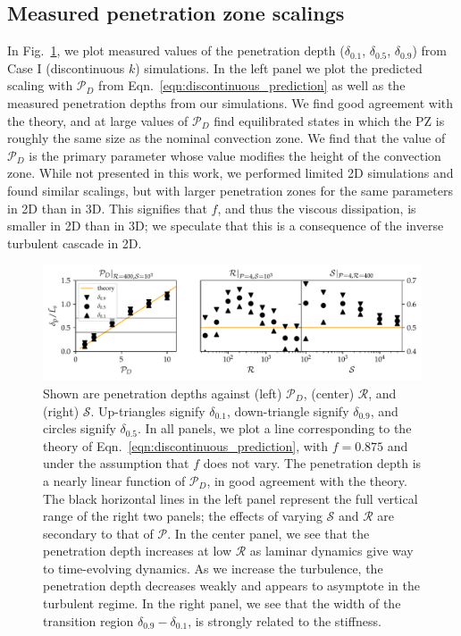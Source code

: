 \documentclass{aastex631}
\newcommand{\mP}{\ensuremath{\mathcal{P}}}
\newcommand{\mR}{\ensuremath{\mathcal{R}}}
\newcommand{\mS}{\ensuremath{\mathcal{S}}}
\begin{document}
\subsection{Measured penetration zone scalings}

In Fig.~\ref{fig:erf_3D_penetration_depths}, we plot measured values of the penetration depth ($\delta_{0.1}$, $\delta_{0.5}$, $\delta_{0.9}$) from Case I (discontinuous $k$) simulations.
In the left panel we plot the predicted scaling with $\mP_D$ from Eqn.~\ref{eqn:discontinuous_prediction} as well as the measured penetration depths from our simulations.
We find good agreement with the theory, and at large values of $\mP_D$ find equilibrated states in which the PZ is roughly the same size as the nominal convection zone.
We find that the value of $\mP_D$ is the primary parameter whose value modifies the height of the convection zone.
While not presented in this work, we performed limited 2D simulations and found similar scalings, but with larger penetration zones for the same parameters in 2D than in 3D.
This signifies that $f$, and thus the viscous dissipation, is smaller in 2D than in 3D; we speculate that this is a consequence of the inverse turbulent cascade in 2D.

\begin{figure}[t!]
\centering
\includegraphics[width=\textwidth]{erf_3D_penetration_depths.pdf}
\caption{
Shown are penetration depths against (left) $\mP_D$, (center) $\mR$, and (right) $\mS$.
Up-triangles signify $\delta_{0.1}$, down-triangle signify $\delta_{0.9}$, and circles signify $\delta_{0.5}$.
In all panels, we plot a line corresponding to the theory of Eqn.~\ref{eqn:discontinuous_prediction}, with $f = 0.875$ and under the assumption that $f$ does not vary.
The penetration depth is a nearly linear function of $\mP_D$, in good agreement with the theory.
The black horizontal lines in the left panel represent the full vertical range of the right two panels; the effects of varying $\mS$ and $\mR$ are secondary to that of $\mP$.
In the center panel, we see that the penetration depth increases at low $\mR$ as laminar dynamics give way to time-evolving dynamics.
As we increase the turbulence, the penetration depth decreases weakly and appears to asymptote in the turbulent regime.
In the right panel, we see that the width of the transition region $\delta_{0.9} - \delta_{0.1}$, is strongly related to the stiffness.
\label{fig:erf_3D_penetration_depths}
}
\end{figure}
\end{document}
